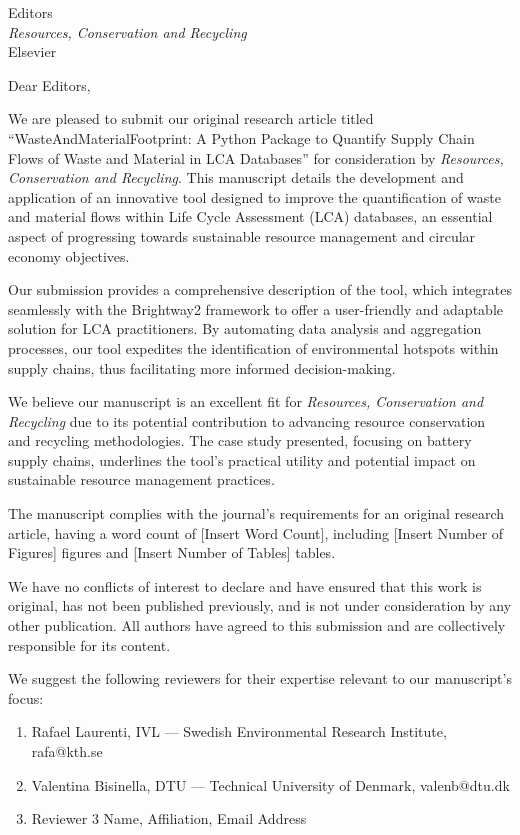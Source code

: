 \documentclass[10pt]{letter}
\begin{document}
\thispagestyle{empty}
\begin{letter}{Editors\\\textit{Resources, Conservation and Recycling}\\Elsevier}

\opening{Dear Editors,}

We are pleased to submit our original research article titled ``WasteAndMaterialFootprint: A Python Package to Quantify Supply Chain Flows of Waste and Material in LCA Databases'' for consideration by \textit{Resources, Conservation and Recycling}. This manuscript details the development and application of an innovative tool designed to improve the quantification of waste and material flows within Life Cycle Assessment (LCA) databases, an essential aspect of progressing towards sustainable resource management and circular economy objectives.

Our submission provides a comprehensive description of the tool, which integrates seamlessly with the Brightway2 framework to offer a user-friendly and adaptable solution for LCA practitioners. By automating data analysis and aggregation processes, our tool expedites the identification of environmental hotspots within supply chains, thus facilitating more informed decision-making.

We believe our manuscript is an excellent fit for \textit{Resources, Conservation and Recycling} due to its potential contribution to advancing resource conservation and recycling methodologies. The case study presented, focusing on battery supply chains, underlines the tool's practical utility and potential impact on sustainable resource management practices.

The manuscript complies with the journal's requirements for an original research article, having a word count of [Insert Word Count], including [Insert Number of Figures] figures and [Insert Number of Tables] tables.

We have no conflicts of interest to declare and have ensured that this work is original, has not been published previously, and is not under consideration by any other publication. All authors have agreed to this submission and are collectively responsible for its content. 

\vspace{1em}

We suggest the following reviewers for their expertise relevant to our manuscript's focus:

\begin{enumerate}
    \item {Rafael Laurenti, IVL --- Swedish Environmental Research Institute, rafa@kth.se}
    \item {Valentina Bisinella,  DTU --- Technical University of Denmark, valenb@dtu.dk}
    \item {Reviewer 3 Name, Affiliation, Email Address}
\end{enumerate}
\vspace{1em}


\end{letter}
\end{document}
